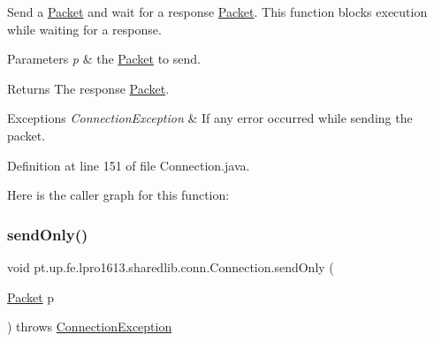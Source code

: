 Send a \hyperlink{classpt_1_1up_1_1fe_1_1lpro1613_1_1sharedlib_1_1conn_1_1_packet}{Packet} and wait for a response \hyperlink{classpt_1_1up_1_1fe_1_1lpro1613_1_1sharedlib_1_1conn_1_1_packet}{Packet}. This function blocks execution while waiting for a response.


\begin{DoxyParams}{Parameters}
{\em p} & the \hyperlink{classpt_1_1up_1_1fe_1_1lpro1613_1_1sharedlib_1_1conn_1_1_packet}{Packet} to send. \\
\hline
\end{DoxyParams}
\begin{DoxyReturn}{Returns}
The response \hyperlink{classpt_1_1up_1_1fe_1_1lpro1613_1_1sharedlib_1_1conn_1_1_packet}{Packet}. 
\end{DoxyReturn}

\begin{DoxyExceptions}{Exceptions}
{\em Connection\+Exception} & If any error occurred while sending the packet. \\
\hline
\end{DoxyExceptions}


Definition at line 151 of file Connection.\+java.

Here is the caller graph for this function\+:
\hypertarget{classpt_1_1up_1_1fe_1_1lpro1613_1_1sharedlib_1_1conn_1_1_connection_acdcf8af7c9a37ede122c6db80d06668f}{}\label{classpt_1_1up_1_1fe_1_1lpro1613_1_1sharedlib_1_1conn_1_1_connection_acdcf8af7c9a37ede122c6db80d06668f} 
\subsubsection{\texorpdfstring{send\+Only()}{sendOnly()}}
{\footnotesize\ttfamily void pt.\+up.\+fe.\+lpro1613.\+sharedlib.\+conn.\+Connection.\+send\+Only (\begin{DoxyParamCaption}\item[{\hyperlink{classpt_1_1up_1_1fe_1_1lpro1613_1_1sharedlib_1_1conn_1_1_packet}{Packet}}]{p }\end{DoxyParamCaption}) throws \hyperlink{classpt_1_1up_1_1fe_1_1lpro1613_1_1sharedlib_1_1exceptions_1_1_connection_exception}{Connection\+Exception}}

